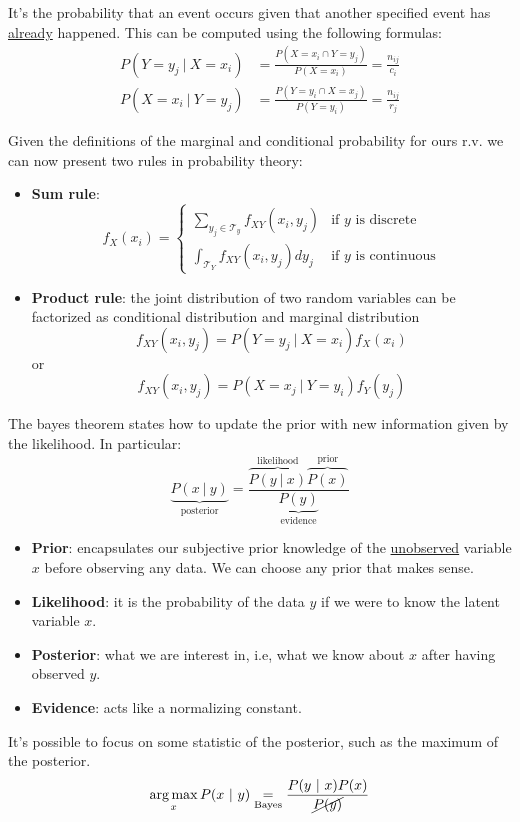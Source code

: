 \documentclass{article}
\begin{document}
\begin{definition}
    It's the probability that an event occurs given that another specified
    event has \underline{already} happened. This can be computed using the
    following formulas: 
    $$
    \begin{aligned}
        P(Y=y_j\ |\ X=x_i)&=\frac{P(X=x_i\cap
        Y=y_j)}{P(X=x_i)}=\frac{n_{ij}}{c_i}\\
        P(X=x_i\ |\ Y=y_j)&=\frac{P(Y=y_i\cap X=x_j)}{P(Y=y_i)}=\frac{n_{ij}}{r_j}
    \end{aligned}
    $$
\end{definition}
Given the definitions of the marginal and conditional probability for ours
r.v. we can now present two rules in probability theory:
\begin{itemize}
    \item \textbf{Sum rule}:
        $$
        f_X(x_i)=\begin{cases}
            \sum_{y_j\in\mathcal{T}_y} f_{XY}(x_i,y_j) & \text{if }y\text{ is
            discrete} \\
                \int_{\mathcal{T}_Y}f_{XY}(x_i,y_j)dy_j & \text{if }y\text{ is
                continuous}
        \end{cases}
        $$
    \item \textbf{Product rule}: the joint distribution of two random
        variables can be factorized as conditional distribution and marginal
        distribution
        {\color{blue}$$f_{XY}(x_i,y_j)=P(Y=y_j\ |\ X=x_i)f_X(x_i)$$}
        or 
        {\color{blue}$$f_{XY}(x_i,y_j)=P(X=x_j\ |\ Y=y_i)f_Y(y_j)$$}
\end{itemize}
\begin{theorem}
    The bayes theorem states how to update the prior with new information
    given by the likelihood. In particular: 
    $$\underbrace{P(x\ |\
    y)}_{\text{posterior}}=\frac{\overbrace{P(y\ |\ x)}^{
    \text{likelihood}}\overbrace{P(x)}^{\text{prior}}}{\underbrace{P(y)}_{\text{evidence}}}$$

    \begin{itemize}
        \item \textbf{Prior}: encapsulates our subjective prior knowledge of
            the \underline{unobserved} variable $x$ before observing any data.
            We can choose any prior that makes sense.
        \item \textbf{Likelihood}: it is the probability of the data $y$ if we
            were to know the latent variable $x$.
        \item \textbf{Posterior}: what we are interest in, i.e, what we know
            about $x$ after having observed $y$.
        \item \textbf{Evidence}: acts like a normalizing constant. 
    \end{itemize}
\end{theorem}
It's possible to focus on some statistic of the posterior, such as the maximum
of the posterior.
$$\argmax_x{P(x\ |\ y)}\underset{\text{Bayes}}=\frac{P(y\ |\
x)P(x)}{\cancel{P(y)}}$$
\end{document}
